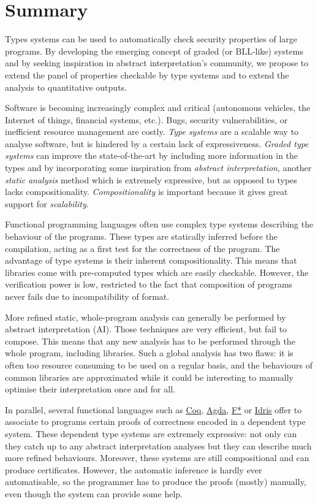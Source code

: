 \documentclass{article}[11pt]
\begin{document}
\newpage


\section{Summary}
Types systems can be used to automatically check security properties of large programs. By developing the emerging concept of graded (or BLL-like) systems and by seeking inspiration in abstract interpretation's community, we propose to extend the panel of properties checkable by type systems and to extend the analysis to quantitative outputs.

Software is becoming increasingly complex and critical (autonomous vehicles, the Internet of things, financial systems, etc.). Bugs, security vulnerabilities, or inefficient resource management are costly. {\em Type systems} are a scalable way to analyse software, but is hindered by a certain lack of expressiveness. {\em Graded type systems} can improve the state-of-the-art by including more information in the types and by incorporating some inspiration from {\em abstract interpretation}, another {\em static analysis} method which is extremely expressive, but as opposed to types lacks compositionality. {\em Compositionality} is important because it gives great support for {\em scalability}.

Functional programming languages often use complex type systems describing the behaviour of the programs. These types are statically inferred before the compilation, acting as a first test for the correctness of the program. The advantage of type systems is their inherent compositionality. This means that libraries come with pre-computed types which are easily checkable. However, the verification power is low, restricted to the fact that composition of programs never fails due to incompatibility of format.

More refined static, whole-program analysis can generally be performed by abstract interpretation (AI). Those techniques are very efficient, but fail to compose. This means that any new analysis has to be performed through the whole program, including libraries. Such a global analysis has two flaws: it is often too resource consuming to be used on a regular basis, and the behaviours of common libraries are approximated while it could be interesting to manually optimise their interpretation once and for all.

In parallel, several functional languages such as \href{https://coq.inria.fr/}{Coq}, \href{http://wiki.portal.chalmers.se/agda/pmwiki.php}{Agda}, \href{https://www.fstar-lang.org/}{F*} or \href{http://www.idris-lang.org/}{Idris} offer to associate to programs certain proofs of correctness encoded in a dependent type system. These dependent type systems are extremely expressive: not only can they catch up to any abstract interpretation analyses but they can describe much more refined behaviours. Moreover, these systems are still compositional and can produce certificates. However, the automatic inference is hardly ever automatisable, so the programmer has to produce the proofs (mostly) manually, even though the system can provide some help.
\end{document}
